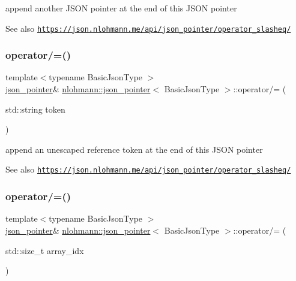 append another J\+S\+ON pointer at the end of this J\+S\+ON pointer 

\begin{DoxySeeAlso}{See also}
\href{https://json.nlohmann.me/api/json_pointer/operator_slasheq/}{\tt https\+://json.\+nlohmann.\+me/api/json\+\_\+pointer/operator\+\_\+slasheq/} 
\end{DoxySeeAlso}
\mbox{\label{classnlohmann_1_1json__pointer_abdd21567b2b1d69329af0f520335e68b}} 
\subsubsection{\texorpdfstring{operator/=()}{operator/=()}\hspace{0.1cm}{\footnotesize\ttfamily [2/3]}}
{\footnotesize\ttfamily template$<$typename Basic\+Json\+Type $>$ \\
\hyperlink{classnlohmann_1_1json__pointer}{json\+\_\+pointer}\& \hyperlink{classnlohmann_1_1json__pointer}{nlohmann\+::json\+\_\+pointer}$<$ Basic\+Json\+Type $>$\+::operator/= (\begin{DoxyParamCaption}\item[{std\+::string}]{token }\end{DoxyParamCaption})\hspace{0.3cm}{\ttfamily [inline]}}



append an unescaped reference token at the end of this J\+S\+ON pointer 

\begin{DoxySeeAlso}{See also}
\href{https://json.nlohmann.me/api/json_pointer/operator_slasheq/}{\tt https\+://json.\+nlohmann.\+me/api/json\+\_\+pointer/operator\+\_\+slasheq/} 
\end{DoxySeeAlso}
\mbox{\label{classnlohmann_1_1json__pointer_a7de51480324eb1c5a89ed552cd699875}} 
\subsubsection{\texorpdfstring{operator/=()}{operator/=()}\hspace{0.1cm}{\footnotesize\ttfamily [3/3]}}
{\footnotesize\ttfamily template$<$typename Basic\+Json\+Type $>$ \\
\hyperlink{classnlohmann_1_1json__pointer}{json\+\_\+pointer}\& \hyperlink{classnlohmann_1_1json__pointer}{nlohmann\+::json\+\_\+pointer}$<$ Basic\+Json\+Type $>$\+::operator/= (\begin{DoxyParamCaption}\item[{std\+::size\+\_\+t}]{array\+\_\+idx }\end{DoxyParamCaption})\hspace{0.3cm}{\ttfamily [inline]}}




